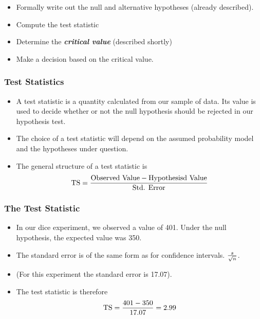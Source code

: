 \documentclass[]{report}
\begin{document}
\begin{itemize}
\item Formally write out the null and alternative hypotheses (already described).
\item Compute the test statistic
\item Determine the \emph{\textbf{critical value}} (described shortly)
\item Make a decision based on the critical value.
\end{itemize}




\subsubsection{Test Statistics}
\begin{itemize}
\item A test statistic is a quantity calculated from our sample of data. Its value is used to decide whether or not the null hypothesis should be rejected in our hypothesis test.
\item The choice of a test statistic will depend on the assumed probability model and the hypotheses under question.
\item The general structure of a test statistic is
\[ \mbox{TS}  = {\mbox{Observed Value} - \mbox{Hypothesisd Value}  \over \mbox{Std. Error}}\]
\end{itemize}



\subsubsection{The Test Statistic}
\begin{itemize}

\item In our dice experiment, we observed a value of 401. Under the null hypothesis, the expected value was 350.
\item The standard error is of the same form as for confidence intervals. $s \over \sqrt{n}$.
\item (For this experiment the standard error is 17.07).
\item The test statistic is therefore \[ \mbox{TS}  = {401 - 350  \over 17.07} = 2.99 \]
\end{itemize}


\end{document}
